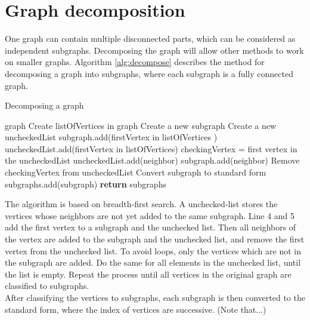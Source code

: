 \documentclass[a4paper]{report}
\begin{document}
		\section{Graph decomposition}
		One graph can contain multiple disconnected parts, which can be considered as independent subgraphs. Decomposing the graph will allow other methods to work on smaller graphs. Algorithm \ref{alg:decompose} describes the method for decomposing a graph into subgraphs, where each subgraph is a fully connected graph.\\
		\begin{algorithm}
			\caption{Decomposing a graph}
			\label{alg:decompose}
			\begin{algorithmic}[1]
				\REQUIRE graph
				Create listOfVertices in graph
				\STATE Create a new subgraph
				\STATE Create a new uncheckedList
				\STATE subgraph.add(firstVertex in listOfVertices )
				\STATE uncheckedList.add(firstVertex in listOfVertices)
				\STATE checkingVertex = first vertex in the uncheckedList
				\STATE uncheckedList.add(neighbor)
				\STATE subgraph.add(neighbor)
				\ENDIF
				\ENDFOR
				\STATE Remove checkingVertex from uncheckedList
				\ENDWHILE
				\STATE Convert subgraph to standard form
				\STATE subgraphs.add(subgraph)
				\ENDWHILE
				\STATE \textbf{return} subgraphs
				
			\end{algorithmic}
		\end{algorithm}
		The algorithm is based on breadth-first search. A unchecked-list stores the vertices whose neighbors are not yet added to the same subgraph. Line 4 and 5 add the first vertex to a subgraph and the unchecked list. Then all neighbors of the vertex are added to the subgraph and the unchecked list, and remove the first vertex from the unchecked list. To avoid loops, only the vertices which are not in the subgraph are added. Do the same for all elements in the unchecked list, until the list is empty. Repeat the process until all vertices in the original graph are classified to subgraphs.\\
		After classifying the vertices to subgraphs, each subgraph is then converted to the standard form, where the index of vertices are successive.
		(Note that...)
		
\end{document}

